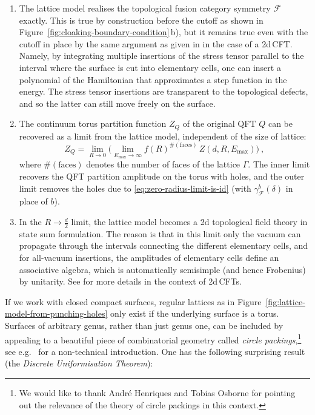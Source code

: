 \documentclass[11pt,a4paper]{article}
\numberwithin{equation}{section}
\begin{document}
\begin{enumerate}
    \item The lattice model realises the topological fusion category symmetry $\mathcal{F}$ exactly. This is true by construction before the cutoff as shown in Figure~\ref{fig:cloaking-boundary-condition}\,b), but it remains true even with the cutoff in place by the same argument as given in \cite[Sec.\,2.3]{Brehm:2021wev} in the case of a 2d\,CFT. 
    Namely, by integrating multiple insertions of the stress tensor parallel to the interval where the surface is cut into elementary cells, one can insert a polynomial of the Hamiltonian that approximates a step function in the energy. The stress tensor insertions are transparent to the topological defects, and so the latter can still move freely on the surface.

    \item The continuum torus partition function $Z_Q$ of the original QFT $Q$ can be recovered as a limit from the lattice model, independent of the size of lattice:
    \begin{equation}
        Z_Q = \lim_{R \to 0} \Big( \lim_{E_{\mathrm{max}}\to\infty} f(R)^{\#(\mathrm{faces})} \, Z(d,R,E_\mathrm{max}) \Big)~,
    \end{equation}
    where $\#(\mathrm{faces})$ denotes the number of faces of the lattice $\Gamma$. The inner limit recovers the QFT partition amplitude on the torus with holes, and the outer limit removes the holes due to \eqref{eq:zero-radius-limit-is-id} (with $\gamma_\mathcal{F}^b(\delta)$ in place of $b$). 

    
    \item 
In the $R \to \frac d2$ limit, the lattice model becomes a 2d topological field theory in state sum formulation. The reason is that in this limit only the vacuum can propagate through the intervals connecting the different elementary cells, and for all-vacuum insertions, the amplitudes of elementary cells define an associative algebra, 
which is automatically semisimple (and hence Frobenius) by unitarity.
    See \cite[Sec.\,3]{Brehm:2021wev} for more details in the context of 2d\,CFTs.
\end{enumerate}

If we work with closed compact surfaces, regular lattices as in Figure~\ref{fig:lattice-model-from-punching-holes} only exist if the underlying surface is a torus. 
Surfaces of arbitrary genus, rather than just genus one, can be included by appealing to a beautiful piece of combinatorial geometry called \textit{circle packings},\footnote{We would like to thank Andr\'e Henriques and Tobias Osborne for pointing out the relevance of the theory of circle packings in this context.}
see e.g.\ \cite{Stephenson:2003} for a non-technical introduction. One has the following surprising result (the \textit{Discrete Uniformisation Theorem}):
\end{document}
